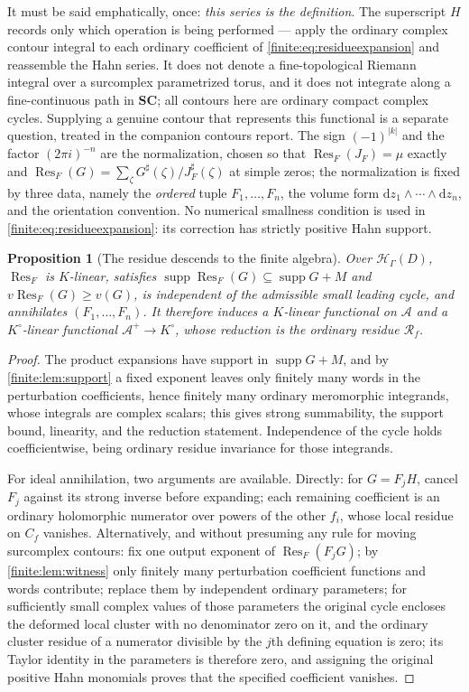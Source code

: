\documentclass[11pt,letterpaper]{article}
\newtheorem{proposition}[theorem]{Proposition}
\theoremstyle{definition}
\theoremstyle{remark}
\newcommand{\SC}{\mathbf{SC}}
\newcommand{\HH}{\mathscr H}
\newcommand{\Alg}{\mathcal A}
\newcommand{\Kc}{K^{\circ}}
\newcommand{\sh}{^{\sharp}}
\newcommand{\dd}{\mathrm d}
\DeclareMathOperator{\supp}{supp}
\DeclareMathOperator{\Res}{Res}
\numberwithin{equation}{section}
\begin{document}
It must be said emphatically, once: \emph{this series is the definition}. The superscript $H$ records only which operation is being performed --- apply the ordinary complex contour integral to each ordinary coefficient of \eqref{finite:eq:residueexpansion} and reassemble the Hahn series. It does not denote a fine-topological Riemann integral over a surcomplex parametrized torus, and it does not integrate along a fine-continuous path in $\SC$; all contours here are ordinary compact complex cycles. Supplying a genuine contour that represents this functional is a separate question, treated in the companion contours report. The sign $(-1)^{|k|}$ and the factor $(2\pi i)^{-n}$ are the normalization, chosen so that $\Res_F(J_F)=\mu$ exactly and $\Res_F(G)=\sum_\zeta G\sh(\zeta)/J_F\sh(\zeta)$ at simple zeros; the normalization is fixed by three data, namely the \emph{ordered} tuple $F_1,\ldots,F_n$, the volume form $\dd z_1\wedge\cdots\wedge\dd z_n$, and the orientation convention. No numerical smallness condition is used in \eqref{finite:eq:residueexpansion}: its correction has strictly positive Hahn support.

\begin{proposition}[The residue descends to the finite algebra]
\label{finite:prop:resdescend}
Over $\HH_\Gamma(D)$, $\Res_F$ is $K$-linear, satisfies $\supp\Res_F(G)\subseteq\supp G+M$ and $v\Res_F(G)\geq v(G)$, is independent of the admissible small leading cycle, and annihilates $(F_1,\ldots,F_n)$. It therefore induces a $K$-linear functional on $\Alg$ and a $\Kc$-linear functional $\Alg^+\to\Kc$, whose reduction is the ordinary residue $\mathcal R_f$.
\end{proposition}

\begin{proof}
The product expansions have support in $\supp G+M$, and by \cref{finite:lem:support} a fixed exponent leaves only finitely many words in the perturbation coefficients, hence finitely many ordinary meromorphic integrands, whose integrals are complex scalars; this gives strong summability, the support bound, linearity, and the reduction statement. Independence of the cycle holds coefficientwise, being ordinary residue invariance for those integrands.

For ideal annihilation, two arguments are available. Directly: for $G=F_jH$, cancel $F_j$ against its strong inverse before expanding; each remaining coefficient is an ordinary holomorphic numerator over powers of the other $f_i$, whose local residue on $C_f$ vanishes. Alternatively, and without presuming any rule for moving surcomplex contours: fix one output exponent of $\Res_F(F_jG)$; by \cref{finite:lem:witness} only finitely many perturbation coefficient functions and words contribute; replace them by independent ordinary parameters; for sufficiently small complex values of those parameters the original cycle encloses the deformed local cluster with no denominator zero on it, and the ordinary cluster residue of a numerator divisible by the $j$th defining equation is zero; its Taylor identity in the parameters is therefore zero, and assigning the original positive Hahn monomials proves that the specified coefficient vanishes.
\end{proof}
\end{document}
